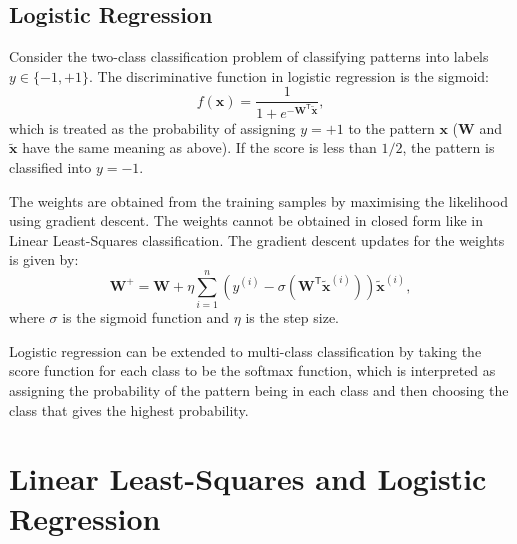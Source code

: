 \documentclass[12pt, a4 paper]{article}
\newcommand{\bx}{\mathbf{x}}
\newcommand{\bW}{\mathbf{W}}
\newcommand{\TT}{\mathsf{T}}
\begin{document}

\subsection*{Logistic Regression}
\label{subsec:logisticRegression}

Consider the two-class classification problem of classifying patterns into labels $y \in \{-1, +1\}$. The discriminative function in logistic regression is the sigmoid:
\begin{equation}
	f(\bx) = \frac{1}{1+e^{-\bW^{\TT}\tilde{\bx}}},
\label{eq:logisticDiscriminator}
\end{equation}
which is treated as the probability of assigning $y=+1$ to the pattern $\bx$ ($\bW$ and $\tilde{\bx}$ have the same meaning as above). If the score is less than $1/2$, the pattern is classified into $y=-1$.

The weights are obtained from the training samples by maximising the likelihood using gradient descent. The weights cannot be obtained in closed form like in Linear Least-Squares classification. The gradient descent updates for the weights is given by:
\begin{equation}
	\bW^{+} = \bW + \eta \sum_{i=1}^{n} \left( y^{(i)} - \sigma(\bW^{\TT}\tilde{\bx}^{(i)}) \right) \tilde{\bx}^{(i)},
\label{eq:logGD}
\end{equation}
where $\sigma$ is the sigmoid function and $\eta$ is the step size.

Logistic regression can be extended to multi-class classification by taking the score function for each class to be the softmax function, which is interpreted as assigning the probability of the pattern being in each class and then choosing the class that gives the highest probability.


\section{Linear Least-Squares and Logistic Regression}
\label{sec:LRandLOG}

\label{prob:1.a}
\end{document}
